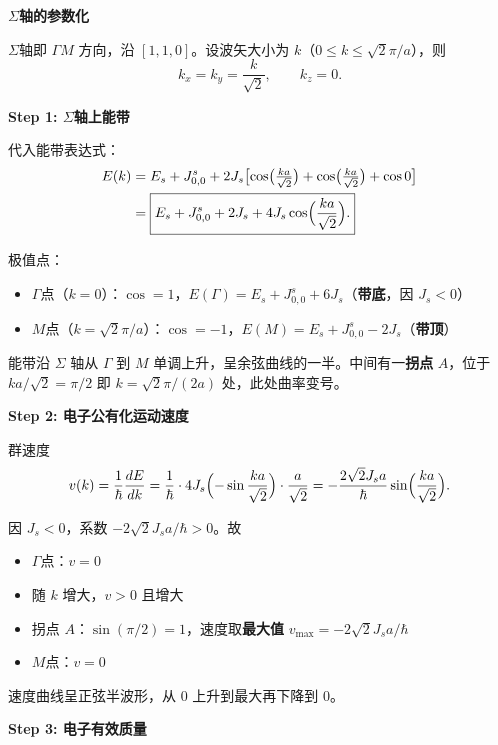 \begin{derivationbox}[标准解题过程]
\textbf{$\Sigma$轴的参数化}

$\Sigma$轴即 $\Gamma M$ 方向，沿 $[1,1,0]$。设波矢大小为 $k$（$0\le k\le\sqrt{2}\pi/a$），则
\begin{equation}
k_x=k_y=\frac{k}{\sqrt{2}},\qquad k_z=0.
\end{equation}

\textbf{Step 1: $\Sigma$轴上能带}

代入能带表达式：
\begin{align}
E(k)&=E_s+J_{0,0}^{s}+2J_s\bigl[\cos\bigl(\tfrac{ka}{\sqrt{2}}\bigr)+\cos\bigl(\tfrac{ka}{\sqrt{2}}\bigr)+\cos0\bigr] \notag\\
&=\boxed{E_s+J_{0,0}^{s}+2J_s+4J_s\cos\Bigl(\frac{ka}{\sqrt{2}}\Bigr).}
\end{align}

极值点：
\begin{itemize}
    \item $\Gamma$点（$k=0$）：$\cos=1$，$E(\Gamma)=E_s+J_{0,0}^{s}+6J_s$（\textbf{带底}，因 $J_s<0$）
    \item $M$点（$k=\sqrt{2}\pi/a$）：$\cos=-1$，$E(M)=E_s+J_{0,0}^{s}-2J_s$（\textbf{带顶}）
\end{itemize}
能带沿 $\Sigma$ 轴从 $\Gamma$ 到 $M$ 单调上升，呈余弦曲线的一半。中间有一\textbf{拐点} $A$，位于 $ka/\sqrt{2}=\pi/2$ 即 $k=\sqrt{2}\pi/(2a)$ 处，此处曲率变号。

\textbf{Step 2: 电子公有化运动速度}

群速度
\begin{equation}
v(k)=\frac{1}{\hbar}\frac{dE}{dk}
=\frac{1}{\hbar}\cdot4J_s\Bigl(-\sin\frac{ka}{\sqrt{2}}\Bigr)\cdot\frac{a}{\sqrt{2}}
=-\frac{2\sqrt{2}J_sa}{\hbar}\sin\Bigl(\frac{ka}{\sqrt{2}}\Bigr).
\end{equation}

因 $J_s<0$，系数 $-2\sqrt{2}J_sa/\hbar>0$。故
\begin{itemize}
    \item $\Gamma$点：$v=0$
    \item 随 $k$ 增大，$v>0$ 且增大
    \item 拐点 $A$：$\sin(\pi/2)=1$，速度取\textbf{最大值} $v_{\max}=-2\sqrt{2}J_sa/\hbar$
    \item $M$点：$v=0$
\end{itemize}
速度曲线呈正弦半波形，从 0 上升到最大再下降到 0。

\textbf{Step 3: 电子有效质量}


\end{derivationbox}
